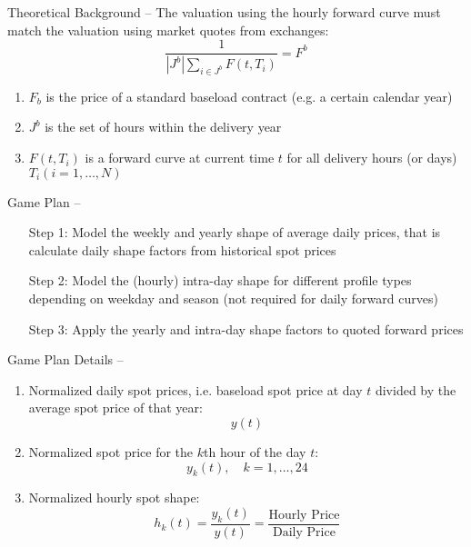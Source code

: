 \documentclass{beamer}
\begin{document}
\begin{frame}{Theoretical Background -- \cite{BurgerGraeberSchindlmayr-2014}}
    The valuation using the hourly forward curve must match the valuation using market quotes from exchanges:
    \[
        \frac{1}{|J^b| \sum_{i \in J^b} F(t, T_i)} = F^b
    \]
    \begin{enumerate}[label=--, itemsep=0.1cm]
        \item $F_b$ is the price of a standard baseload contract (e.g. a certain calendar year)

        \item $J^b$ is the set of hours within the delivery year

        \item $F(t, T_i)$ is a forward curve at current time $t$ for all delivery hours (or days) $T_i (i = 1, \ldots, N)$
    \end{enumerate}
\end{frame}


\begin{frame}{Game Plan -- \cite{BurgerGraeberSchindlmayr-2014}}
    \begin{enumerate}
        \item[Step 1:] Model the weekly and yearly shape of average daily prices, that is calculate daily shape factors from historical spot prices

        \item[Step 2:] Model the (hourly) intra-day shape for different profile types depending on weekday and season (not required for daily forward curves)

        \item[Step 3:] Apply the yearly and intra-day shape factors to quoted forward prices
    \end{enumerate}
\end{frame}


\begin{frame}{Game Plan Details -- \cite{BurgerGraeberSchindlmayr-2014}}
    \begin{enumerate}[label=$\bullet$, itemsep=0.1cm]
        \item Normalized daily spot prices, i.e. baseload spot price at day $t$ divided by the average spot price of that year:
              \[ y(t) \]

        \item Normalized spot price for the $k$th hour of the day $t$:
              \[ y_k(t), \quad k = 1, \ldots, 24 \]

        \item Normalized hourly spot shape:
              \[
                  h_k(t)
                  = \frac{y_k(t)}{y(t)}
                  = \frac{\text{Hourly Price}}{\text{Daily Price}}
              \]
    \end{enumerate}
\end{frame}
\end{document}
